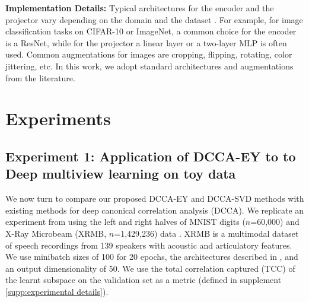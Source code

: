 \textbf{Implementation Details:} Typical architectures for the encoder and the projector vary depending on the domain and the dataset \cite{balestriero2023cookbook}. For example, for image classification tasks on CIFAR-10 or ImageNet, a common choice for the encoder is a ResNet, while for the projector a linear layer or a two-layer MLP is often used. Common augmentations for images are cropping, flipping, rotating, color jittering, etc. In this work, we adopt standard architectures and augmentations from the literature.


\section{Experiments}

\subsection{Experiment 1: Application of DCCA-EY to to Deep multiview learning on toy data}

We now turn to compare our proposed DCCA-EY and DCCA-SVD methods with existing methods for deep canonical correlation analysis (DCCA). We replicate an experiment from \cite{wang2015stochastic} using the left and right halves of MNIST \cite{lecun1998gradient} digits ($n$=60,000) and X-Ray Microbeam (XRMB, $n$=1,429,236) data \cite{westbury1994x}. XRMB is a multimodal dataset of speech recordings from 139 speakers with acoustic and articulatory features. We use minibatch sizes of 100 for 20 epochs, the architectures described in \cite{wang2015stochastic}, and an output dimensionality of 50.  We use the total correlation captured (TCC) of the learnt subspace on the validation set as a metric (defined in supplement \ref{supp:experimental details}).

